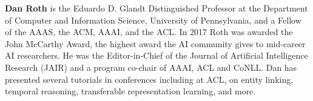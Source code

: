{{\bfseries Dan Roth} is the Eduardo D. Glandt Distinguished Professor at the Department of Computer
and Information Science, University of Pennsylvania, and a Fellow of the AAAS, the ACM, AAAI,
and the ACL. In 2017 Roth was awarded the John
McCarthy Award, the highest award the AI community gives to mid-career AI researchers. He was
the Editor-in-Chief of the Journal of Artificial Intelligence Research (JAIR) and a program co-chair
of AAAI, ACL and CoNLL. Dan has presented
several tutorials in conferences including at ACL,
on entity linking, temporal reasoning, transferable
representation learning, and more.

}